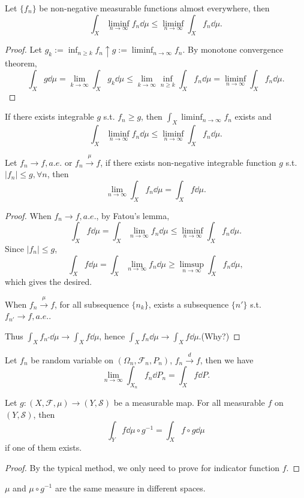 \begin{theorem}
    Let $\{f_n\}$ be non-negative measurable functions almost everywhere,
	then
	\[
	\int_X \liminf_{n\to \infty}f_n \dd \mu
	\le \liminf_{n\to \infty}\int_X f_n \dd \mu.
	\]
\end{theorem}
\begin{proof}[Proof]
    Let $g_k := \inf_{n\ge k} f_n \uparrow g:= \liminf_{n\to \infty} f_n$.
	By monotone convergence theorem,
	\[
	\int_X g\dd \mu = \lim_{k\to \infty}\int_X g_k\dd\mu
	\le \lim_{k\to \infty}\inf_{n\ge k}\int_X f_n \dd \mu
	= \liminf_{n\to \infty} \int_X f_n\dd\mu.
	\]
\end{proof}

\begin{corollary}
    If there exists integrable $g$ s.t. $f_n\ge g$,
	then $\int_X \liminf_{n\to \infty} f_n$
	exists and
	\[
	\int_X \liminf_{n\to \infty}f_n \dd \mu
	\le \liminf_{n\to \infty} \int_X f_n\dd \mu.
	\]
\end{corollary}

\begin{theorem}[Lebesgue]
    Let $f_n \to f, a.e.$ or $f_n \xrightarrow{\mu} f$,
	if there exists non-negative integrable function $g$ s.t. $|f_n|\le g, \forall n$,
	then
	\[
	\lim_{n\to \infty}\int_X f_n\dd \mu = \int_X f\dd \mu.
	\]
\end{theorem}
\begin{proof}[Proof]
    When $f_n\to f, a.e.$, by Fatou's lemma,
	\[
	\int_X f\dd\mu = \int_X \lim_{n\to \infty}f_n\dd \mu \le
	\liminf_{n\to \infty} \int_X f_n \dd \mu.
	\]
	Since $|f_n|\le g$,
	\[
	\int_X f\dd \mu = \int_X \lim_{n\to \infty}f_n\dd \mu
	\ge \limsup_{n\to\infty} \int_X f_n \dd\mu,
	\]
	which gives the desired.

	When $f_n\xrightarrow{\mu} f$, for all subsequence $\{n_k\}$,
	exists a subsequence $\{n'\}$ s.t.
	$f_{n'} \to f, a.e.$.

	Thus $\int_X f_{n'}\dd\mu \to \int_X f\dd \mu$, hence
	$\int_X f_n\dd \mu \to \int_Xf\dd\mu$.(Why?)
\end{proof}

\begin{corollary}
    Let $f_n$ be random variable on $(\Omega_n, \mathscr{F}_n, P_n)$,
	$f_n \xrightarrow{d} f$, then we have
	\[
	\lim_{n\to \infty}\int_{X_n} f_n\dd P_n = \int_X f \dd P.
	\]
\end{corollary}

\begin{proposition}
	Let $g: (X,\mathscr{F}, \mu) \to (Y, \mathscr{S})$ be a measurable map.
	For all measurable $f$ on  $(Y, \mathscr{S})$, then
	\[
	\int_Y f\dd \mu\circ g^{-1} = \int_X f\circ g\dd \mu
	\]
	if one of them exists.
\end{proposition}
\begin{proof}[Proof]
    By the typical method, we only need to prove for indicator function $f$.
\end{proof}
\begin{remark}
    $\mu$ and $\mu\circ g^{-1}$ are the same measure in different spaces.
\end{remark}

